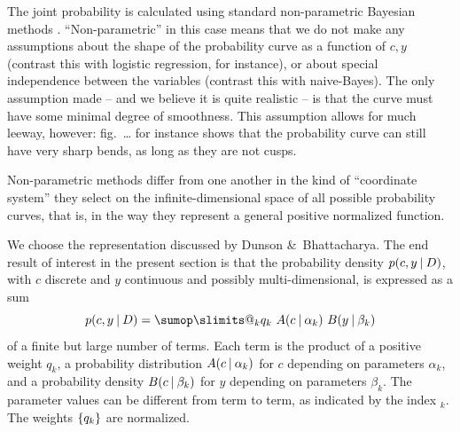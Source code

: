 \documentclass[\ifafour a4paper,12pt,\else a5paper,10pt,\fi%
onecolumn,oneside,article,%
british%
]{memoir}
\makeatletter
\theoremstyle{remark}
\theoremstyle{innote}
\def\sum{\DOTSI\sumop\slimits@}
\newcommand*{\amp}{\&}
\newcommand*{\pencil}{{\fontencoding{U}\fontfamily{fontawesometwo}\selectfont\symbol{210}}}
\newcommand{\mynotep}[1]{{\footnotesize\color{notecolour}\pencil\ #1}}
\DeclarePairedDelimiter\set{\{}{\}} %
\renewcommand*{\|}[1][]{\nonscript\:#1\vert\nonscript\:\mathopen{}}
\newcommand*{\fig}{fig.}%
\newcommand*{\eg}{{e.g.}}
\makeatother
\begin{document}
The joint probability is calculated using standard non-parametric Bayesian methods \autocites[for introductions and reviews see \eg][]{walker2013,muelleretal2004b,hjort1996}. \enquote{Non-parametric} in this case means that we do not make any assumptions about the shape of the probability curve as a function of $c,y$ (contrast this with logistic regression, for instance), or about special independence between the variables (contrast this with naive-Bayes). The only assumption made -- and we believe it is quite realistic -- is that the curve must have some minimal degree of smoothness. This assumption allows for much leeway, however: \fig\mynotep{\ldots} for instance shows that the probability curve can still have very sharp bends, as long as they are not cusps.

Non-parametric methods differ from one another in the kind of \enquote{coordinate system} they select on the infinite-dimensional space of all possible probability curves, that is, in the way they represent a general positive normalized function.

We choose the representation discussed by Dunson \amp\ Bhattacharya\autocites{dunsonetal2011}[see also the special case presented by][]{rasmussen1999}. The end result of interest in the present section is that the probability density $p(c,y \| D)$, with $c$ discrete and $y$ continuous and possibly multi-dimensional, is expressed as a sum
\begin{equation}
  \label{eq:representation_P}
  p(c, y \| D) = \sum_{k} q_{k}\ A(c \| \alpha_{k})\ B(y \| \beta_{k})
\end{equation}
of a finite but large number of terms. Each term is the product of a positive weight $q_{k}$, a probability distribution $A(c \| \alpha_{k})$ for $c$ depending on parameters $\alpha_{k}$, and a probability density $B(c \| \beta_{k})$ for $y$ depending on parameters $\beta_{k}$. The parameter values can be different from term to term, as indicated by the index ${}_{k}$. The weights $\set{q_{k}}$ are normalized.
\end{document}
